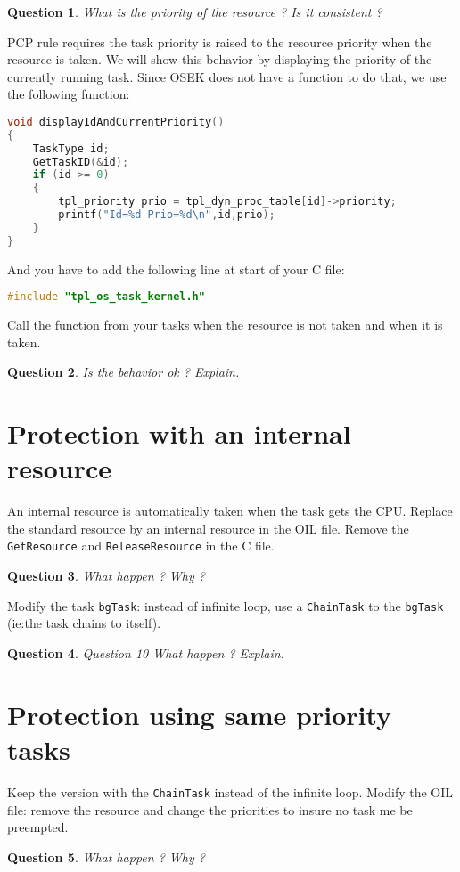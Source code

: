 \documentclass[11pt]{article}
\newtheorem{ex}{Question}
\begin{document}
\begin{ex}
What is the priority of the resource ? Is it consistent ?
\end{ex}

PCP rule requires the task priority is raised to the resource priority when the resource is taken. We will show this behavior by displaying the priority of the currently running task. Since OSEK does not have a function to do that, we use the following function:

\begin{lstlisting}[language=C]
void displayIdAndCurrentPriority()
{
    TaskType id;
    GetTaskID(&id);
    if (id >= 0)
    {
        tpl_priority prio = tpl_dyn_proc_table[id]->priority;
        printf("Id=%d Prio=%d\n",id,prio); 
    }
}
\end{lstlisting}

And you have to add the following line at start of your C file:

\begin{lstlisting}[language=C]
 #include "tpl_os_task_kernel.h"
\end{lstlisting}

Call the function from your tasks when the resource is not taken and when it is taken.

\begin{ex}
Is the behavior ok ? Explain.
\end{ex}

\section{Protection with an internal resource}

An internal resource is automatically taken when the task gets the CPU. Replace the standard resource by an internal resource in the OIL file. Remove the \texttt{GetResource} and \texttt{ReleaseResource} in the C file.

\begin{ex}
What happen ? Why ?
\end{ex}

Modify the task \texttt{bgTask}: instead of infinite loop, use a \texttt{ChainTask} to the \texttt{bgTask} (ie:the task chains to itself).

\begin{ex}
Question 10 What happen ? Explain.
\end{ex}

\section{Protection using same priority tasks}

Keep the version with the \texttt{ChainTask} instead of the infinite loop.
Modify the OIL file: remove the resource and change the priorities to insure no task
me be preempted.

\begin{ex}
What happen ? Why ?
\end{ex}
\end{document}
